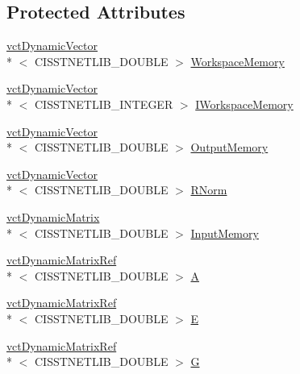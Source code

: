 \subsection*{Protected Attributes}
\begin{DoxyCompactItemize}
\item 
\hyperlink{classvct_dynamic_vector}{vct\-Dynamic\-Vector}\\*
$<$ C\-I\-S\-S\-T\-N\-E\-T\-L\-I\-B\-\_\-\-D\-O\-U\-B\-L\-E $>$ \hyperlink{classnmr_l_sq_lin_solution_dynamic_afa790c8ff0361dfe31522d1287cc03c2}{Workspace\-Memory}
\item 
\hyperlink{classvct_dynamic_vector}{vct\-Dynamic\-Vector}\\*
$<$ C\-I\-S\-S\-T\-N\-E\-T\-L\-I\-B\-\_\-\-I\-N\-T\-E\-G\-E\-R $>$ \hyperlink{classnmr_l_sq_lin_solution_dynamic_a5d42d35b6d178d1cdfc61c15af11a512}{I\-Workspace\-Memory}
\item 
\hyperlink{classvct_dynamic_vector}{vct\-Dynamic\-Vector}\\*
$<$ C\-I\-S\-S\-T\-N\-E\-T\-L\-I\-B\-\_\-\-D\-O\-U\-B\-L\-E $>$ \hyperlink{classnmr_l_sq_lin_solution_dynamic_a1a8dc3a952ff9e7ea4bd94d9ec9c41bf}{Output\-Memory}
\item 
\hyperlink{classvct_dynamic_vector}{vct\-Dynamic\-Vector}\\*
$<$ C\-I\-S\-S\-T\-N\-E\-T\-L\-I\-B\-\_\-\-D\-O\-U\-B\-L\-E $>$ \hyperlink{classnmr_l_sq_lin_solution_dynamic_a59172e2f2811910c7ac6c83509ecf504}{R\-Norm}
\item 
\hyperlink{classvct_dynamic_matrix}{vct\-Dynamic\-Matrix}\\*
$<$ C\-I\-S\-S\-T\-N\-E\-T\-L\-I\-B\-\_\-\-D\-O\-U\-B\-L\-E $>$ \hyperlink{classnmr_l_sq_lin_solution_dynamic_abcfb3ce4549a3ac8926ca94a071fa61f}{Input\-Memory}
\item 
\hyperlink{classvct_dynamic_matrix_ref}{vct\-Dynamic\-Matrix\-Ref}\\*
$<$ C\-I\-S\-S\-T\-N\-E\-T\-L\-I\-B\-\_\-\-D\-O\-U\-B\-L\-E $>$ \hyperlink{classnmr_l_sq_lin_solution_dynamic_aa4a41abac141e2e55dd5cafb59169dfd}{A}
\item 
\hyperlink{classvct_dynamic_matrix_ref}{vct\-Dynamic\-Matrix\-Ref}\\*
$<$ C\-I\-S\-S\-T\-N\-E\-T\-L\-I\-B\-\_\-\-D\-O\-U\-B\-L\-E $>$ \hyperlink{classnmr_l_sq_lin_solution_dynamic_a7c1ac112b07f3edd33d348fe0a40fb71}{E}
\item 
\hyperlink{classvct_dynamic_matrix_ref}{vct\-Dynamic\-Matrix\-Ref}\\*
$<$ C\-I\-S\-S\-T\-N\-E\-T\-L\-I\-B\-\_\-\-D\-O\-U\-B\-L\-E $>$ \hyperlink{classnmr_l_sq_lin_solution_dynamic_a399cb314fb848d36f58c14830bad0c28}{G}

\end{DoxyCompactItemize}
